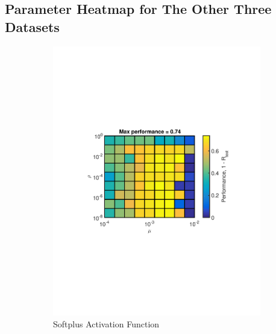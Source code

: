 \documentclass[journal,a4paper,onecolumn,11pt]{IEEEtran}
\begin{document}
\subsection{Parameter Heatmap for The Other Three Datasets}
\begin{figure}[!h] 
	\centering
	\begin{subfigure}{.5\textwidth}
		\centering
		\includegraphics[width=\textwidth]{Opt_sp_ucchar.pdf}
		\caption{Softplus Activation Function}
		\label{fig:Opt_sp_ucchar}
	\end{subfigure}%
	\begin{subfigure}{.5\textwidth}
		\centering

\end{subfigure}
\end{figure}
\end{document}

